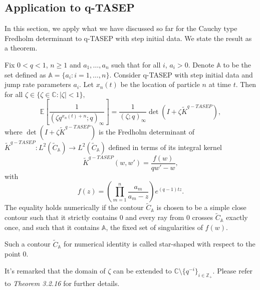 \subsection{Application to q-TASEP}
In this section, we apply what we have discussed so far for the Cauchy type Fredholm determinant to q-TASEP with step initial data. We state the result as a theorem.

\begin{theorem}
\label{cauchy-type-application-to-qtasep}
Fix $0 < q<1$, $n \ge 1$ and $a_1, \dots, a_n$ such that for all $i$, $a_i > 0$. Denote $\mathbb{A}$ to be the set defined as $\mathbb{A} = \{a_i: i = 1, \dots, n\}$. Consider q-TASEP with step initial data and jump rate parameters $a_i$. Let $x_n(t)$ be the location of particle $n$ at time $t$. Then for all $\zeta \in \{ \zeta \in \mathbb{C}: |\zeta| < 1 \},$ $$\mathbb{E} \left[ \frac{1}{(\zeta q^{x_n(t) + n}; q)_{\infty}} \right] = \frac{1}{(\zeta; q)_{\infty}} \det(I + \zeta \tilde{K}^{q-TASEP}),$$ where $\det(I + \zeta \tilde{K}^{q-TASEP})$ is the Fredholm determinant of $\tilde{K}^{q-TASEP}: L^2(\tilde{C}_{\mathbb{A}}) \rightarrow  L^2(\tilde{C}_{\mathbb{A}})$ defined in terms of its integral kernel $$\tilde{K}^{q-TASEP}(w,w') = \frac{f(w)}{qw' - w},$$ with $$f(z) = \left( \prod_{m=1}^{n} \frac{a_m}{a_m - z} \right) e^{(q-1)tz}.$$ 
The equality holds numerically if the contour $\tilde{C}_{\mathbb{A}}$ is chosen to be a simple close contour such that it strictly contains $0$ and every ray from $0$ crosses $\tilde{C}_{\mathbb{A}}$ exactly once, and such that it contains $\mathbb{A}$, the fixed set of singularities of $f(w)$.
\end{theorem}

\begin{remark}
Such a contour $\tilde{C}_{\mathbb{A}}$ for numerical identity is called star-shaped with respect to the point $0$.
\end{remark}

\begin{remark}
It's remarked that the domain of $\zeta$ can be extended to $\mathbb{C} \setminus \{q^{-i}\}_{i \in \mathbb{Z}_+}$. Please refer to \cite{macdonald2014} \textit{Theorem 3.2.16} for further details.
\end{remark}

